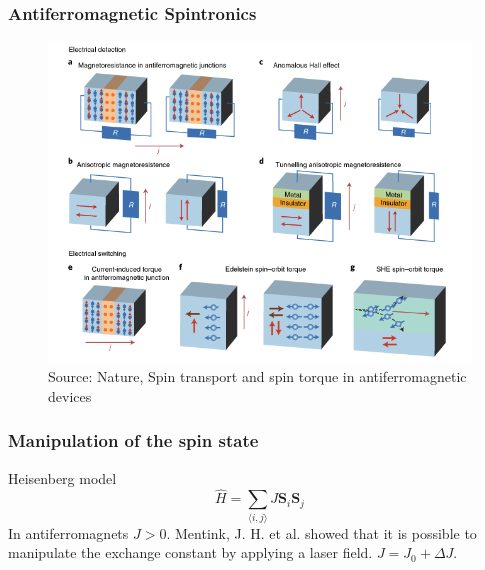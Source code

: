 \documentclass{beamer}
\begin{document}
\begin{frame}
\frametitle{Antiferromagnetic Spintronics}

\begin{figure}
  \begin{minipage}[c]{0.6\textwidth}
    \includegraphics[width=\textwidth]{../Figures/afm_device.png}
  \end{minipage}\hfill
  \begin{minipage}[c]{0.2\textwidth}
    \caption{Source: Nature, Spin transport and spin torque in antiferromagnetic devices} \label{fig:2}
  \end{minipage}
\end{figure}

\end{frame}


\begin{frame}
\frametitle{Manipulation of the spin state}
\begin{block}{Heisenberg model}
\begin{equation} 
\hat{H} = \sum_{\langle i,j \rangle} J \boldsymbol{S}_i \boldsymbol{S}_j \nonumber
\end{equation}
In antiferromagnets $J > 0$. Mentink, J. H. et al. showed that it is possible to manipulate the exchange constant by applying a laser field. $J = J_0 + \Delta J$.
\end{block}
\end{frame}

\end{document}
